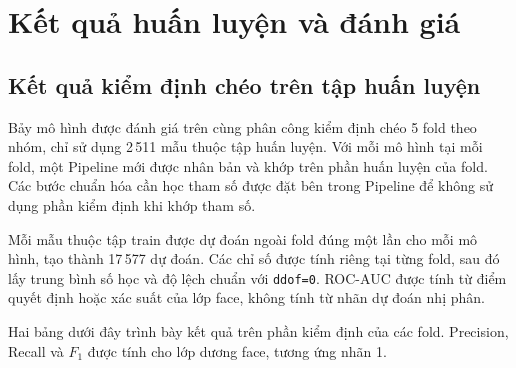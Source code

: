 \documentclass[12pt,a4paper,oneside]{report}
\begin{document}
\section{Kết quả huấn luyện và đánh giá}
\subsection{Kết quả kiểm định chéo trên tập huấn luyện}

Bảy mô hình được đánh giá trên cùng phân công kiểm định
chéo 5 fold theo nhóm, chỉ sử dụng 2\,511 mẫu thuộc tập
huấn luyện. Với mỗi mô hình tại mỗi fold, một Pipeline
mới được nhân bản và khớp trên phần huấn luyện của fold.
Các bước chuẩn hóa cần học tham số được đặt bên trong
Pipeline để không sử dụng phần kiểm định khi khớp tham số.

Mỗi mẫu thuộc tập train được dự đoán ngoài fold đúng
một lần cho mỗi mô hình, tạo thành 17\,577 dự đoán.
Các chỉ số được tính riêng tại từng fold, sau đó lấy
trung bình số học và độ lệch chuẩn với \texttt{ddof=0}.
ROC-AUC được tính từ điểm quyết định hoặc xác suất
của lớp face, không tính từ nhãn dự đoán nhị phân.

Hai bảng dưới đây trình bày kết quả trên phần kiểm định
của các fold. Precision, Recall và $F_1$ được tính cho
lớp dương face, tương ứng nhãn 1.
\end{document}
